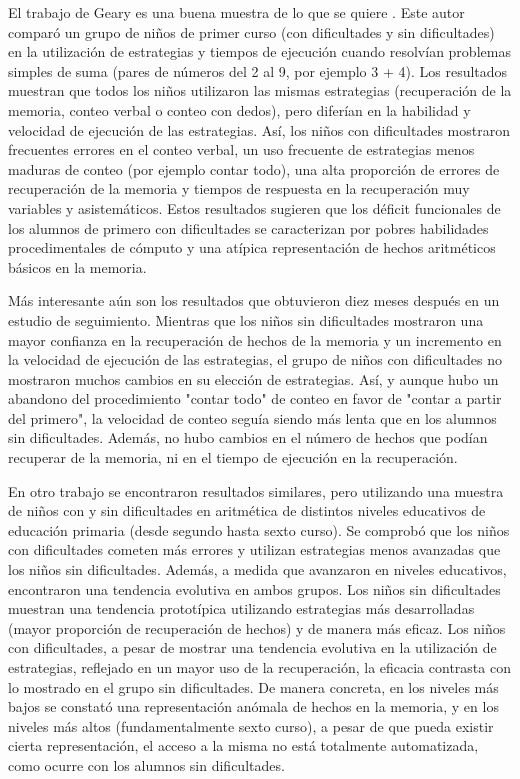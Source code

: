 \documentclass{article}
\begin{document}
El trabajo de Geary es una buena muestra de lo que se quiere \cite{geary1991cognitive, geary1999numerical}. Este autor comparó un grupo de niños de primer curso (con dificultades y sin dificultades) en la utilización de estrategias y tiempos de ejecución cuando resolvían problemas simples de suma (pares de números del 2 al 9, por ejemplo 3 + 4). Los resultados muestran que todos los niños utilizaron las mismas estrategias (recuperación de la memoria, conteo verbal o conteo con dedos), pero diferían en la habilidad y velocidad de ejecución de las estrategias. Así, los niños con dificultades mostraron frecuentes errores en el conteo verbal, un uso frecuente de estrategias menos maduras de conteo (por ejemplo contar todo), una alta proporción de errores de recuperación de la memoria y tiempos de respuesta en la recuperación muy variables y asistemáticos. Estos resultados sugieren que los déficit funcionales de los alumnos de primero con dificultades se caracterizan por pobres habilidades procedimentales de cómputo y una atípica representación de hechos aritméticos básicos en la memoria.

Más interesante aún son los resultados que obtuvieron diez meses después en un estudio de seguimiento. Mientras que los niños sin dificultades mostraron una mayor confianza en la recuperación de hechos de la memoria y un incremento en la velocidad de ejecución de las estrategias, el grupo de niños con dificultades no mostraron muchos cambios en su elección de estrategias. Así, y aunque hubo un abandono del procedimiento "contar todo" de conteo en favor de "contar a partir del primero", la velocidad de conteo seguía siendo más lenta que en los alumnos sin dificultades. Además, no hubo cambios en el número de hechos que podían recuperar de la memoria, ni en el tiempo de ejecución en la recuperación.

En otro trabajo se encontraron resultados similares, pero utilizando una muestra de niños con y sin dificultades en aritmética de distintos niveles educativos de educación primaria (desde segundo hasta sexto curso). Se comprobó que los niños con dificultades cometen más errores y utilizan estrategias menos avanzadas que los niños sin dificultades. Además, a medida que avanzaron en niveles educativos, encontraron una tendencia evolutiva en ambos grupos. Los niños sin dificultades muestran una tendencia prototípica utilizando estrategias más desarrolladas (mayor proporción de recuperación de hechos) y de manera más eficaz. Los niños con dificultades, a pesar de mostrar una tendencia evolutiva en la utilización de estrategias, reflejado en un mayor uso de la recuperación, la eficacia contrasta con lo mostrado en el grupo sin dificultades. De manera concreta, en los niveles más bajos se constató una representación anómala de hechos en la memoria, y en los niveles más altos (fundamentalmente sexto curso), a pesar de que pueda existir cierta representación, el acceso a la misma no está totalmente automatizada, como ocurre con los alumnos sin dificultades.
\end{document}
